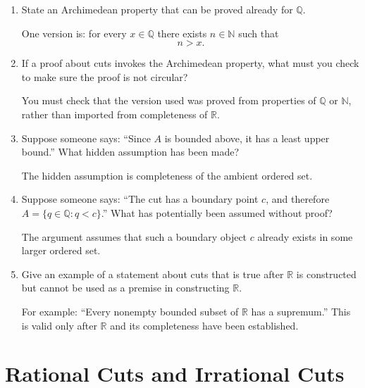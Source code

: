 \documentclass{self-check}
\begin{document}
\begin{enumerate}[label=\arabic*., itemsep=10pt]
\item State an Archimedean property that can be proved already for $\mathbb{Q}$.

\begin{answer}
One version is:
for every $x\in\mathbb{Q}$ there exists $n\in\mathbb{N}$ such that
\[
n>x.
\]
\end{answer}

\item If a proof about cuts invokes the Archimedean property, what must you check to make sure the proof is not circular?

\begin{answer}
You must check that the version used was proved from properties of $\mathbb{Q}$ or $\mathbb{N}$, rather than imported from completeness of $\mathbb{R}$.
\end{answer}

\item Suppose someone says:
``Since $A$ is bounded above, it has a least upper bound.''
What hidden assumption has been made?

\begin{answer}
The hidden assumption is completeness of the ambient ordered set.
\end{answer}

\item Suppose someone says:
``The cut has a boundary point $c$, and therefore $A=\{q\in\mathbb{Q}:q<c\}$.''
What has potentially been assumed without proof?

\begin{answer}
The argument assumes that such a boundary object $c$ already exists in some larger ordered set.
\end{answer}

\item Give an example of a statement about cuts that is true after $\mathbb{R}$ is constructed but cannot be used as a premise in constructing $\mathbb{R}$.

\begin{answer}
For example: ``Every nonempty bounded subset of $\mathbb{R}$ has a supremum.'' This is valid only after $\mathbb{R}$ and its completeness have been established.
\end{answer}

\end{enumerate}

\section{Rational Cuts and Irrational Cuts}
\end{document}
